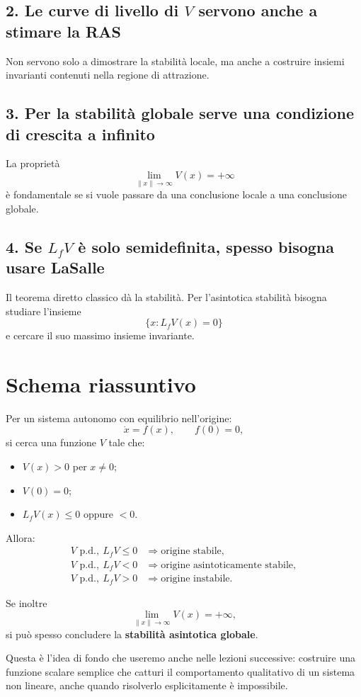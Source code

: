 \subsection*{2. Le curve di livello di \(V\) servono anche a stimare la RAS}
Non servono solo a dimostrare la stabilità locale, ma anche a costruire insiemi invarianti contenuti nella regione di attrazione.

\subsection*{3. Per la stabilità globale serve una condizione di crescita a infinito}
La proprietà
\[
\lim_{\|x\|\to\infty}V(x)=+\infty
\]
è fondamentale se si vuole passare da una conclusione locale a una conclusione globale.

\subsection*{4. Se \(L_fV\) è solo semidefinita, spesso bisogna usare LaSalle}
Il teorema diretto classico dà la stabilità.  
Per l'asintotica stabilità bisogna studiare l'insieme
\[
\{x : L_fV(x)=0\}
\]
e cercare il suo massimo insieme invariante.

\section{Schema riassuntivo}

Per un sistema autonomo con equilibrio nell'origine:
\[
\dot x=f(x),
\qquad
f(0)=0,
\]
si cerca una funzione \(V\) tale che:
\begin{itemize}
    \item \(V(x)>0\) per \(x\neq 0\);
    \item \(V(0)=0\);
    \item \(L_fV(x)\le 0\) oppure \(<0\).
\end{itemize}

Allora:
\[
\boxed{
\begin{array}{ll}
V \text{ p.d.},\ L_fV\le 0
&\Rightarrow \text{origine stabile},\\[4pt]
V \text{ p.d.},\ L_fV<0
&\Rightarrow \text{origine asintoticamente stabile},\\[4pt]
V \text{ p.d.},\ L_fV>0
&\Rightarrow \text{origine instabile}.
\end{array}
}
\]

Se inoltre
\[
\lim_{\|x\|\to\infty}V(x)=+\infty,
\]
si può spesso concludere la \textbf{stabilità asintotica globale}.

\medskip

\noindent
Questa è l'idea di fondo che useremo anche nelle lezioni successive: costruire una funzione scalare semplice che catturi il comportamento qualitativo di un sistema non lineare, anche quando risolverlo esplicitamente è impossibile.